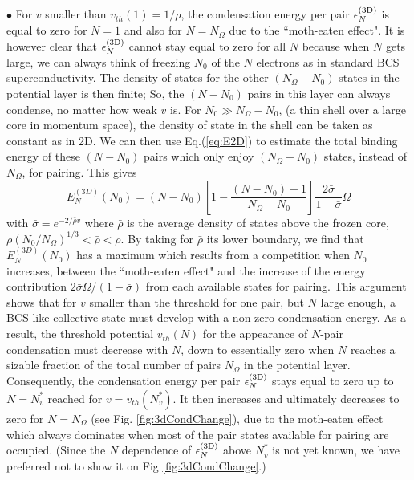 \documentclass[5p,twocolumn]{elsarticle}
\begin{document}
$\bullet$ For $v$ smaller than $v_{th}(1)=1/\rho$, the condensation energy per pair $\epsilon_N^{{\text{(3D)}}}$ is equal to zero for $N=1$ and also for $N=N_\Omega$ due to the ``moth-eaten effect".  It is however clear that $\epsilon_N^{{\text{(3D)}}}$ cannot stay equal to zero for all $N$ because when $N$ gets large, we can always think of freezing $N_0$ of the $N$ electrons as in standard BCS superconductivity. The density of states for the other $(N_\Omega - N_0)$ states in the potential layer is then finite; So, the $(N-N_0)$ pairs in this layer can always condense, no matter how weak $v$ is. For $N_{0}\gg{}N_{\Omega}-N_{0}$, (a thin shell over a large core in momentum space), the density of state in the shell can be taken as constant as in 2D. We can then use Eq.(\ref{eq:E2D}) to estimate the total binding energy of these $(N-N_0)$ pairs which only enjoy $(N_\Omega - N_0)$ states, instead of $N_{\Omega}$, for pairing. This gives
\begin{equation}\label{eq:E3D}
{{E}}_N^{(3D)}(N_0)=(N-N_0)\left[1-\frac{(N-N_0)-1}{N_\Omega-N_0}\right]\frac{2\bar\sigma}{1-\bar\sigma}\Omega
\end{equation}
with $\bar{\sigma}=e^{-2/{\bar{\rho}v}}$ where $\bar\rho$ is the average density of states above the frozen core, $\rho(N_0/N_\Omega)^{ 1/3}<\bar\rho<\rho$. By taking for  $\bar\rho$ its lower boundary, we find that ${{E}}_N^{(3D)}(N_0)$ has a maximum which results from a competition when $N_0$ increases, between the ``moth-eaten effect" and the increase of the energy contribution $2\bar\sigma\Omega/(1-\bar\sigma)$  from each available states for pairing.
This argument shows that for $v$ smaller than the threshold for one pair, but $N$ large enough, a BCS-like collective state must develop with a non-zero condensation energy. 
As a result, the threshold potential  $v_{th}(N)$ for the appearance of $N$-pair condensation  must decrease with $N$, down to essentially zero when $N$ reaches a sizable fraction of the total number of pairs $N_\Omega$ in the potential layer.  Consequently, the condensation energy per pair $\epsilon^{{{\text{(3D)}}}}_{N}$ stays equal to zero up to $N=N_v^*$ reached for $v=v_{th}(N_v^*)$. It then increases and ultimately decreases to zero for $N=N_\Omega$ (see Fig. \ref{fig:3dCondChange}), due to the moth-eaten effect which always dominates when most of the pair states available for pairing are occupied.  (Since the $N$ dependence of $\epsilon_{N}^{{{\text{(3D)}}}}$ above $N_{v}^{*}$ is not yet known, we have preferred not to show it on Fig \ref{fig:3dCondChange}.) 
\end{document}
